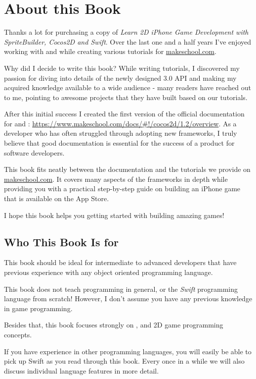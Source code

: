 \chapter{About this Book}

Thanks a lot for purchasing a copy of \textit{Learn 2D iPhone Game Development
with SpriteBuilder, Cocos2D and Swift}. Over the last one and a half years I've
enjoyed working with \SB{} and \cocos{} while creating various tutorials for
\url{makeschool.com}. 

Why did I decide to write this book? While writing tutorials, I discovered my
passion for diving into details of the newly designed \cocos{} 3.0 API and
making my acquired knowledge available to a wide audience - many readers
have reached out to me, pointing to awesome projects that they have built based
on our tutorials.

After this initial success I created the first version of the official
documentation for \SB{} and \cocos{}:
\url{https://www.makeschool.com/docs/#!/cocos2d/1.2/overview}. As a developer
who has often struggled through adopting new frameworks, I truly believe that
good documentation is essential for the success of a product for software
developers.

This book fits neatly between the documentation and the tutorials we provide on
\url{makeschool.com}. It covers many aspects of the frameworks in depth while
providing you with a practical step-by-step guide on building an iPhone game that is available on the
App Store.

I hope this book helps you getting started with building amazing games!

\section{Who This Book Is for}
This book should be ideal for intermediate to advanced developers that have
previous experience with any object oriented programming language.

This book does not teach programming in general, or the \textit{Swift}
programming language from scratch! However, I don't assume you have any previous
knowledge in game programming.

Besides that, this book focuses strongly on \SB{}, \cocos{} and 2D game
programming concepts. 

If you have experience in other programming languages, you will easily be able
to pick up Swift as you read through this book. Every once in a while we will
also discuss individual language features in more detail.

